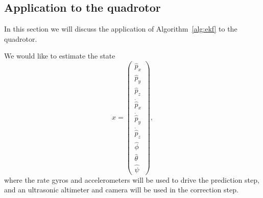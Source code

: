 {%
\subsection{Application to the quadrotor}

In this section we will discuss the application of
Algorithm~\ref{alg:ekf} to the quadrotor.

We would like to estimate the state
\[
\hat{x} = \begin{pmatrix} \hat{p}_x \\ \hat{p}_y \\ \hat{p}_z \\
\dot{\hat{p}}_x \\ \dot{\hat{p}}_y \\ \dot{\hat{p}}_z \\ \hat{\phi} \\
\hat{\theta} \\ \hat{\psi}
\end{pmatrix},
\]
where the rate gyros and accelerometers will be used to drive the
prediction step, and an ultrasonic altimeter and camera will be used
in the correction step.

}
